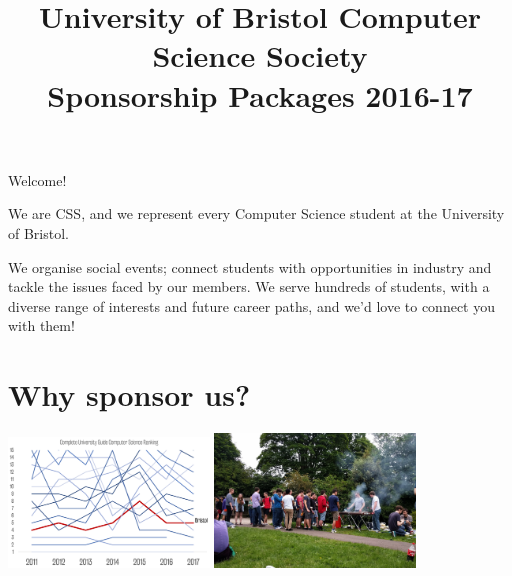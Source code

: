 \documentclass[]{article}
\title{University of Bristol Computer Science Society \\ Sponsorship Packages 2016-17}
\author{}
\date{}
\begin{document}
\maketitle

\vspace{-1cm}

Welcome!

We are CSS, and we represent every Computer Science student at the University of Bristol. 

We organise social events; connect students with opportunities in industry and tackle the issues faced by our members. We serve hundreds of students, with a diverse range of interests and future career paths, and we'd love to connect you with them! 

\section*{Why sponsor us?}

\begin{center}
  \includegraphics[width=0.4\textwidth]{ranking-chart}
  \includegraphics[width=0.4\textwidth]{bbq}
\end{center}
\end{document}
